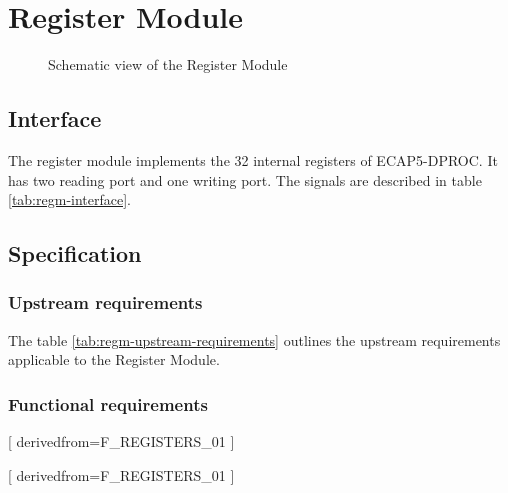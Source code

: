 \section{Register Module}

  \begin{figure}[h!]
      \centering
      
      \caption{Schematic view of the Register Module}
      \label{fig:regm}
  \end{figure}

  \subsection{Interface}

    \begin{content}
        The register module implements the 32 internal registers of ECAP5-DPROC. It has two reading port and one writing port. The signals are described in table \ref{tab:regm-interface}. 
      \end{content}

    

  \subsection{Specification}

    \subsubsection{Upstream requirements}

      The table \ref{tab:regm-upstream-requirements} outlines the upstream requirements applicable to the Register Module.

      

    \subsubsection{Functional requirements}

      [
          derivedfrom=F\_REGISTERS\_01
        ]

      [
          derivedfrom=F\_REGISTERS\_01
        ]

